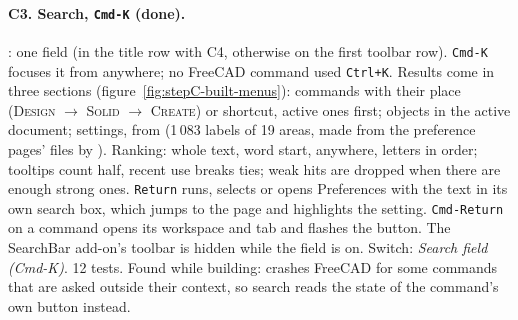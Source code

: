 \paragraph{C3. Search, \texttt{Cmd-K} (done).} : one field (in the title row with C4,
otherwise on the first toolbar row). \texttt{Cmd-K} focuses it from anywhere; no FreeCAD command used
\texttt{Ctrl+K}. Results come in three sections (figure~\ref{fig:stepC-built-menus}): commands with their place
(\textsc{Design $\rightarrow$ Solid $\rightarrow$ Create}) or shortcut, active ones first; objects in the active
document; settings, from  (1\,083 labels of 19 areas, made from the preference pages'
 files by ). Ranking: whole text, word start, anywhere, letters in
order; tooltips count half, recent use breaks ties; weak hits are dropped when there are enough strong ones.
\texttt{Return} runs, selects or opens Preferences with the text in its own search box, which jumps to the page
and highlights the setting. \texttt{Cmd-Return} on a command opens its workspace and tab and flashes the button.
The SearchBar add-on's toolbar is hidden while the field is on. Switch: \emph{Search field (Cmd-K)}. 12 tests.
Found while building:  crashes FreeCAD for some commands that are asked outside their
context, so search reads the state of the command's own button instead.

